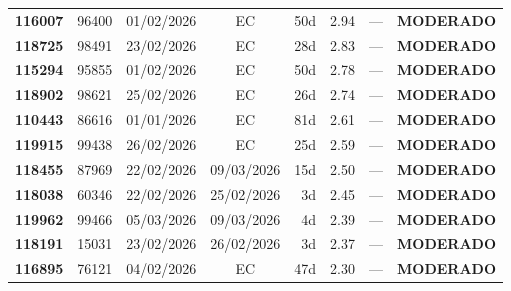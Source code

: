 \documentclass[a4paper,10pt]{article}
\begin{document}
\begin{center}
\begin{longtable}{>{\scriptsize}r>{\scriptsize}r>{\scriptsize}c>{\scriptsize}c>{\scriptsize}r>{\scriptsize}r>{\scriptsize}r>{\scriptsize}l}
\textcolor{anomyellow}{\textbf{116007}} & 96400 & 01/02/2026 & \textcolor{anomorange}{EC} & 50d & \textcolor{anomyellow}{2.94} & --- & \textcolor{anomyellow}{\textbf{MODERADO}} \\

\textcolor{anomyellow}{\textbf{118725}} & 98491 & 23/02/2026 & \textcolor{anomorange}{EC} & 28d & \textcolor{anomyellow}{2.83} & --- & \textcolor{anomyellow}{\textbf{MODERADO}} \\

\textcolor{anomyellow}{\textbf{115294}} & 95855 & 01/02/2026 & \textcolor{anomorange}{EC} & 50d & \textcolor{anomyellow}{2.78} & --- & \textcolor{anomyellow}{\textbf{MODERADO}} \\

\textcolor{anomyellow}{\textbf{118902}} & 98621 & 25/02/2026 & \textcolor{anomorange}{EC} & 26d & \textcolor{anomyellow}{2.74} & --- & \textcolor{anomyellow}{\textbf{MODERADO}} \\

\textcolor{anomyellow}{\textbf{110443}} & 86616 & 01/01/2026 & \textcolor{anomorange}{EC} & 81d & \textcolor{anomyellow}{2.61} & --- & \textcolor{anomyellow}{\textbf{MODERADO}} \\

\textcolor{anomyellow}{\textbf{119915}} & 99438 & 26/02/2026 & \textcolor{anomorange}{EC} & 25d & \textcolor{anomyellow}{2.59} & --- & \textcolor{anomyellow}{\textbf{MODERADO}} \\

\textcolor{anomyellow}{\textbf{118455}} & 87969 & 22/02/2026 & 09/03/2026 & 15d & \textcolor{anomyellow}{2.50} & --- & \textcolor{anomyellow}{\textbf{MODERADO}} \\

\textcolor{anomyellow}{\textbf{118038}} & 60346 & 22/02/2026 & 25/02/2026 & 3d & \textcolor{anomyellow}{2.45} & --- & \textcolor{anomyellow}{\textbf{MODERADO}} \\

\textcolor{anomyellow}{\textbf{119962}} & 99466 & 05/03/2026 & 09/03/2026 & 4d & \textcolor{anomyellow}{2.39} & --- & \textcolor{anomyellow}{\textbf{MODERADO}} \\

\textcolor{anomyellow}{\textbf{118191}} & 15031 & 23/02/2026 & 26/02/2026 & 3d & \textcolor{anomyellow}{2.37} & --- & \textcolor{anomyellow}{\textbf{MODERADO}} \\

\textcolor{anomyellow}{\textbf{116895}} & 76121 & 04/02/2026 & \textcolor{anomorange}{EC} & 47d & \textcolor{anomyellow}{2.30} & --- & \textcolor{anomyellow}{\textbf{MODERADO}} \\


\end{longtable}
\end{center}
\end{document}
